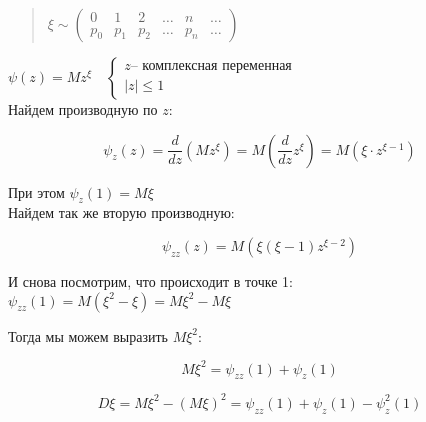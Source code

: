 \documentclass{article}
\begin{document}
\begin{quote}
$\xi \sim
\begin{pmatrix}
0 & 1 & 2 & \ldots & n & \ldots\\
p_0 & p_1 & p_2 & \ldots & p_n & \ldots
\end{pmatrix}$
\end{quote}


$\psi(z) = Mz^\xi \quad
\begin{cases}
z  \text{-- комплексная переменная}\\
|z| \leq 1
\end{cases}$
\\

Найдем производную по $z$:

$$\psi_z(z) = \frac{d}{dz}(Mz^\xi) = M(\frac{d}{dz}z^\xi) = M(\xi\cdot z^{\xi - 1})$$

При этом $\psi_z(1) = M\xi$
\\

Найдем так же вторую производную:

$$\psi_{zz}(z) = M(\xi(\xi - 1)z^{\xi - 2})$$

И снова посмотрим, что происходит в точке 1: $\psi_{zz}(1) = M(\xi^2 - \xi) = M\xi^2 - M\xi$

Тогда мы можем выразить $M\xi^2$:

$$M\xi^2 = \psi_{zz}(1) + \psi_z(1)$$

$$D\xi = M\xi^2 - (M\xi)^2 = \psi_{zz}(1) + \psi_z(1) - \psi_z^2(1)$$
\end{document}
